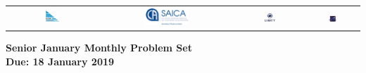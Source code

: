 \documentclass{article}
\begin{document}
\setlength{\tabcolsep}{0.015\textwidth}
\begin{center} \begin{tabular}{cccc}
	\includegraphics[width=0.16\textwidth]{SAMF_logo.jpg} &
	\includegraphics[width=0.35\textwidth]{SAICA_logo.jpg} &
	\includegraphics[width=0.18\textwidth]{Liberty_logo.jpg} &
	\includegraphics[width=0.18\textwidth]{SAMO2019.png}
\end{tabular} \end{center}


\vspace{30pt}

\begin{center}
\textbf{\Large Senior January Monthly Problem Set}
\\ \vspace{1em}
\textbf{\large Due: 18 January 2019}
\end{center}

\vspace{24pt}
\end{document}
